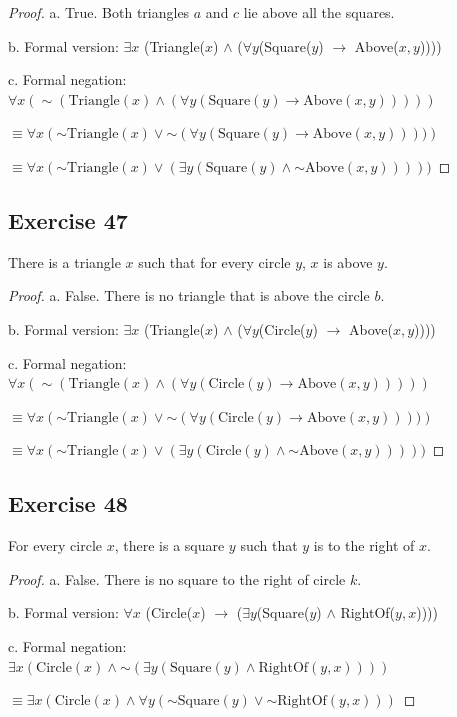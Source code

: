 \documentclass[14pt]{extarticle}
\newcommand{\fa}{\forall}
\newcommand{\te}{\exists}
\begin{document}
\begin{proof}
a. True. Both triangles $a$ and $c$ lie above all the
squares.

b. Formal version: $\te x$ (Triangle($x$) $\wedge$ ($\fa y$(Square($y$) $\to$ Above($x, y$))))

c. Formal negation: $\fa x({\sim (\text{Triangle}(x) \wedge (\fa y(\text{Square}(y) \to \text{Above}(x, y))))})$

$\equiv \fa x ({\sim \text{Triangle}(x)} \vee {\sim(\fa y(\text{Square}(y) \to \text{Above}(x, y))))})$

$\equiv \fa x ({\sim \text{Triangle}(x)} \vee (\te y(\text{Square}(y) \wedge {\sim \text{Above}(x, y)}))))$
\end{proof}

\subsection{Exercise 47}
There is a triangle $x$ such that for every circle $y$, $x$ is above $y$.

\begin{proof}
a. False. There is no triangle that is above the circle $b$.

b. Formal version: $\te x$ (Triangle($x$) $\wedge$ ($\fa y$(Circle($y$) $\to$ Above($x, y$))))

c. Formal negation: $\fa x({\sim (\text{Triangle}(x) \wedge (\fa y(\text{Circle}(y) \to \text{Above}(x, y))))})$

$\equiv \fa x ({\sim \text{Triangle}(x)} \vee {\sim(\fa y(\text{Circle}(y) \to \text{Above}(x, y))))})$

$\equiv \fa x ({\sim \text{Triangle}(x)} \vee (\te y(\text{Circle}(y) \wedge {\sim \text{Above}(x, y)}))))$
\end{proof}

\subsection{Exercise 48}
For every circle $x$, there is a square $y$ such that $y$ is to the right of $x$.

\begin{proof}
a. False. There is no square to the right of circle $k$.

b. Formal version: $\fa x$ (Circle($x$) $\to$ ($\te y$(Square($y$) $\wedge$ RightOf($y, x$))))

c. Formal negation: $\te x(\text{Circle}(x) \wedge {\sim (\te y(\text{Square}(y) \wedge \text{RightOf}(y, x)))})$

$\equiv \te x(\text{Circle}(x) \wedge \fa y({\sim \text{Square}(y)} \vee {\sim\text{RightOf}(y, x)}))$
\end{proof}
\end{document}
